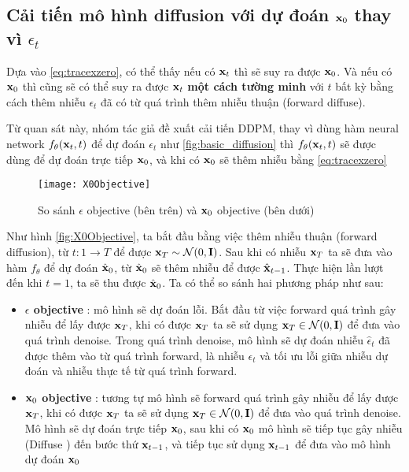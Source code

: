 \subsection{Cải tiến mô hình diffusion với dự đoán $\mathbf{x}_0$ thay vì $\epsilon_t$}
\label{subsec:X0Objective}

Dựa vào \autoref{eq:tracexzero}, có thể thấy nếu có $\mathbf{x}_{t}$ thì sẽ suy ra được $\mathbf{x}_0$. Và nếu có $\mathbf{x}_0$ thì cũng sẽ có thể suy ra được $\mathbf{x}_{t}$ \textbf{một cách tường minh} với $t$ bất kỳ bằng cách thêm nhiễu $\epsilon_t$ đã có từ quá trình thêm nhiễu thuận (forward diffuse).

Từ quan sát này, nhóm tác giả \cite{nichol2021improved} đề xuất cải tiến DDPM, thay vì dùng hàm neural network $f_{\theta}(\mathbf{x}_t, t)$ để dự đoán $\epsilon_t$ như \autoref{fig:basic_diffusion} thì $f_{\theta}(\mathbf{x}_t, t)$ sẽ được dùng để dự đoán trực tiếp $\mathbf{x}_0$, và khi có $\mathbf{x}_0$ sẽ thêm nhiễu bằng  \autoref{eq:tracexzero}


\begin{figure}[H]
	\captionsetup{skip=2pt}
	\texttt{[image: X0Objective]}
	\caption{So sánh $\epsilon$ objective (bên trên) và  $\mathbf{x}_0$ objective (bên dưới)}
	\label{fig:X0Objective}
\end{figure}

Như hình \autoref{fig:X0Objective}, ta bắt đầu bằng việc thêm nhiễu thuận (forward diffusion), từ $t: 1 \rightarrow T$ để được $\mathbf{x}_T \sim \mathcal{N} (0, \mathbf{I})$. Sau khi có nhiễu $\mathbf{x}_{T}$ ta sẽ đưa vào hàm $f_{\theta}$ để dự đoán $\hat{\mathbf{x}}_0$, từ $\hat{\mathbf{x}}_0$ sẽ thêm nhiễu để được $\hat{\mathbf{x}}_{t-1}$. Thực hiện lần lượt đến khi $t = 1$, ta sẽ thu được $\hat{\mathbf{x}}_0$. Ta có thể so sánh hai phương pháp như sau:

\begin{itemize}
	\item \textbf{$\epsilon$  objective} :  mô hình sẽ dự đoán lỗi. Bắt đầu từ việc forward quá trình gây nhiễu để lấy được $\mathbf{x}_T$, khi có được $\mathbf{x}_T$ ta sẽ sử dụng $\mathbf{x}_T \in \mathcal{N}(0, \mathbf{I})$ để đưa vào quá trình denoise. Trong quá trình denoise, mô hình sẽ dự đoán nhiễu $\hat{\epsilon}_t$ đã được thêm vào từ quá trình forward, là nhiễu $\epsilon_t$ và tối ưu lỗi giữa nhiễu dự đoán và nhiễu thực tế từ quá trình forward.
	\item \textbf{$\mathbf{x}_0$ objective} : tương tự mô hình sẽ forward quá trình gây nhiễu để lấy được $\mathbf{x}_T$, khi có được $\mathbf{x}_T$ ta sẽ sử dụng $\mathbf{x}_T \in \mathcal{N}(0, \mathbf{I})$ để đưa vào quá trình denoise. Mô hình sẽ dự đoán trực tiếp $\mathbf{x}_0$, sau khi có $\mathbf{x}_0$ mô hình sẽ tiếp tục gây nhiễu (Diffuse ) đến bước thứ $\mathbf{x}_{t-1}$, và tiếp tục sử dụng $\mathbf{x}_{t-1}$ để đưa vào mô hình dự đoán $\mathbf{x}_0$
\end{itemize}

